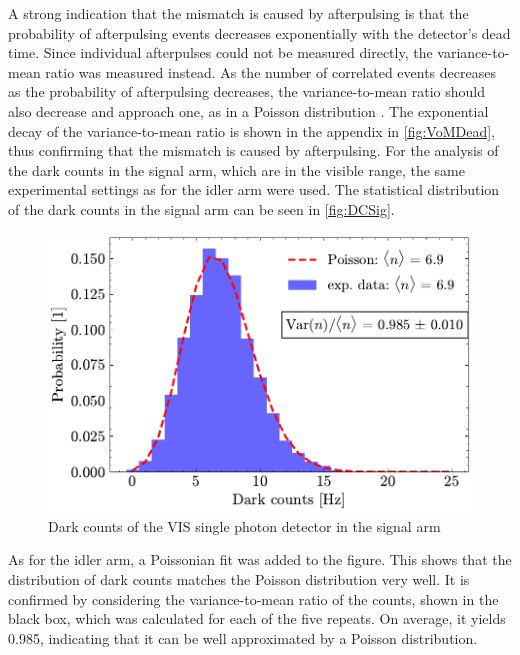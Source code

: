 A strong indication that the mismatch is caused by afterpulsing is that the probability of afterpulsing events decreases exponentially with the detector's dead time. Since individual afterpulses could not be measured directly, the variance-to-mean ratio was measured instead. As the number of correlated events decreases as the probability of afterpulsing decreases, the variance-to-mean ratio should also decrease and approach one, as in a Poisson distribution \cite{humerSimpleRobustMethod2015}. The exponential decay of the variance-to-mean ratio is shown in the appendix in \autoref{fig:VoMDead}, thus confirming that the mismatch is caused by afterpulsing. \newline
For the analysis of the dark counts in the signal arm, which are in the visible range, the same experimental settings as for the idler arm were used. The statistical distribution of the dark counts in the signal arm can be seen in \autoref{fig:DCSig}.
\begin{figure}[tb!]
	\centering
	\includegraphics[width=.7\textwidth]{Images/DC_Sig_2.pdf}
	\caption{Dark counts of the VIS single photon detector in the signal arm}
	\label{fig:DCSig}
\end{figure}
As for the idler arm, a Poissonian fit was added to the figure. This shows that the distribution of dark counts matches the Poisson distribution very well. It is confirmed by considering the variance-to-mean ratio of the counts, shown in the black box, which was calculated for each of the five repeats. On average, it yields 0.985, indicating that it can be well approximated by a Poisson distribution.


